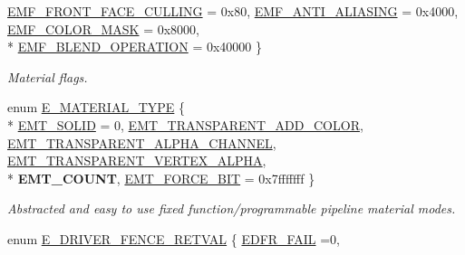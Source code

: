 \begin{DoxyCompactItemize}
\hyperlink{namespaceirr_1_1video_a8a3bc00ae8137535b9fbc5f40add70d3a1b3b367405da4f85738c8dbe7647842d}{E\+M\+F\+\_\+\+F\+R\+O\+N\+T\+\_\+\+F\+A\+C\+E\+\_\+\+C\+U\+L\+L\+I\+NG} = 0x80, 
\hyperlink{namespaceirr_1_1video_a8a3bc00ae8137535b9fbc5f40add70d3a9f512ba36b9ff14e1743150fb68196b0}{E\+M\+F\+\_\+\+A\+N\+T\+I\+\_\+\+A\+L\+I\+A\+S\+I\+NG} = 0x4000, 
\hyperlink{namespaceirr_1_1video_a8a3bc00ae8137535b9fbc5f40add70d3a72ede4598946d81f12aa407fb680fc40}{E\+M\+F\+\_\+\+C\+O\+L\+O\+R\+\_\+\+M\+A\+SK} = 0x8000, 
\\*
\hyperlink{namespaceirr_1_1video_a8a3bc00ae8137535b9fbc5f40add70d3ab9cbb5be402278cf0276da84acd3da14}{E\+M\+F\+\_\+\+B\+L\+E\+N\+D\+\_\+\+O\+P\+E\+R\+A\+T\+I\+ON} = 0x40000
 \}\begin{DoxyCompactList}\small\item\em Material flags. \end{DoxyCompactList}
\item 
enum \hyperlink{namespaceirr_1_1video_ac8e9b6c66f7cebabd1a6d30cbc5430f1}{E\+\_\+\+M\+A\+T\+E\+R\+I\+A\+L\+\_\+\+T\+Y\+PE} \{ \\*
\hyperlink{namespaceirr_1_1video_ac8e9b6c66f7cebabd1a6d30cbc5430f1a9bc471b9c18c9e2d20496004d2a2e803}{E\+M\+T\+\_\+\+S\+O\+L\+ID} = 0, 
\hyperlink{namespaceirr_1_1video_ac8e9b6c66f7cebabd1a6d30cbc5430f1a1b5a814c4466aca2943ff056003a50d1}{E\+M\+T\+\_\+\+T\+R\+A\+N\+S\+P\+A\+R\+E\+N\+T\+\_\+\+A\+D\+D\+\_\+\+C\+O\+L\+OR}, 
\hyperlink{namespaceirr_1_1video_ac8e9b6c66f7cebabd1a6d30cbc5430f1ac08aa3715ad41281472202107a81f736}{E\+M\+T\+\_\+\+T\+R\+A\+N\+S\+P\+A\+R\+E\+N\+T\+\_\+\+A\+L\+P\+H\+A\+\_\+\+C\+H\+A\+N\+N\+EL}, 
\hyperlink{namespaceirr_1_1video_ac8e9b6c66f7cebabd1a6d30cbc5430f1a26529b1cf18ec4d8073809f6bd15ebbb}{E\+M\+T\+\_\+\+T\+R\+A\+N\+S\+P\+A\+R\+E\+N\+T\+\_\+\+V\+E\+R\+T\+E\+X\+\_\+\+A\+L\+P\+HA}, 
\\*
{\bfseries E\+M\+T\+\_\+\+C\+O\+U\+NT}, 
\hyperlink{namespaceirr_1_1video_ac8e9b6c66f7cebabd1a6d30cbc5430f1a85962cdf5aab2ddd245cada9b1859e30}{E\+M\+T\+\_\+\+F\+O\+R\+C\+E\+\_\+B\+IT} = 0x7fffffff
 \}\begin{DoxyCompactList}\small\item\em Abstracted and easy to use fixed function/programmable pipeline material modes. \end{DoxyCompactList}
\item 
enum \hyperlink{namespaceirr_1_1video_ae93020af22218bae203c7bb52b87590b}{E\+\_\+\+D\+R\+I\+V\+E\+R\+\_\+\+F\+E\+N\+C\+E\+\_\+\+R\+E\+T\+V\+AL} \{ \hyperlink{namespaceirr_1_1video_ae93020af22218bae203c7bb52b87590ba8f692fda45c1681a4092bd62a4a412ae}{E\+D\+F\+R\+\_\+\+F\+A\+IL} =0, 

\end{DoxyCompactItemize}
